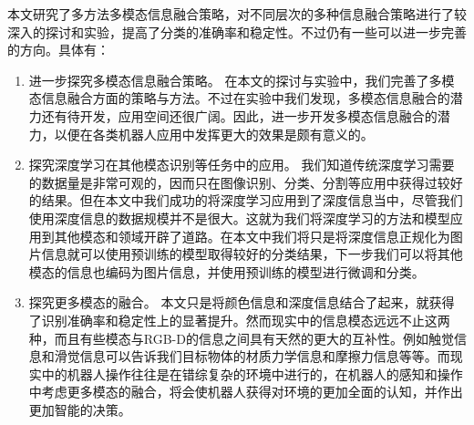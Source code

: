 本文研究了多方法多模态信息融合策略，对不同层次的多种信息融合策略进行了较深入的探讨和实验，提高了分类的准确率和稳定性。不过仍有一些可以进一步完善的方向。具体有：
\begin{enumerate}
\item 进一步探究多模态信息融合策略。
在本文的探讨与实验中，我们完善了多模态信息融合方面的策略与方法。不过在实验中我们发现，多模态信息融合的潜力还有待开发，应用空间还很广阔。因此，进一步开发多模态信息融合的潜力，以便在各类机器人应用中发挥更大的效果是颇有意义的。
\item 探究深度学习在其他模态识别等任务中的应用。
我们知道传统深度学习需要的数据量是非常可观的，因而只在图像识别、分类、分割等应用中获得过较好的结果。但在本文中我们成功的将深度学习应用到了深度信息当中，尽管我们使用深度信息的数据规模并不是很大。这就为我们将深度学习的方法和模型应用到其他模态和领域开辟了道路。在本文中我们将只是将深度信息正规化为图片信息就可以使用预训练的模型取得较好的分类结果，下一步我们可以将其他模态的信息也编码为图片信息，并使用预训练的模型进行微调和分类。
\item 探究更多模态的融合。
本文只是将颜色信息和深度信息结合了起来，就获得了识别准确率和稳定性上的显著提升。然而现实中的信息模态远远不止这两种，而且有些模态与RGB-D的信息之间具有天然的更大的互补性。例如触觉信息和滑觉信息可以告诉我们目标物体的材质力学信息和摩擦力信息等等。而现实中的机器人操作往往是在错综复杂的环境中进行的，在机器人的感知和操作中考虑更多模态的融合，将会使机器人获得对环境的更加全面的认知，并作出更加智能的决策。
\end{enumerate}